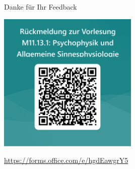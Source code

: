 \documentclass[aspectratio=169]{beamer}
\begin{document}
\begin{frame}{Danke für Ihr Feedback}

\begin{center}
    \includegraphics[width=0.5\textwidth]{feedback_QR.png}
\end{center}

\url{https://forms.office.com/e/hgdEawgrY5}

\end{frame}
\end{document}
